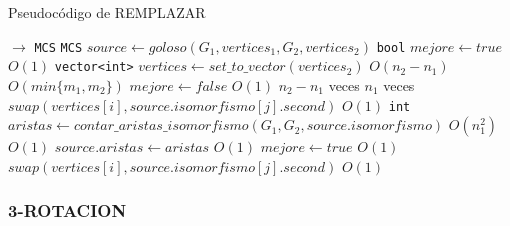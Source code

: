 \begin{algorithm}[H]
  \small
  \begin{algorithmic}[1]
  \caption{Pseudocódigo de REMPLAZAR}
  \label{algo:1-1}
    $\rightarrow$ \texttt{MCS}
      \State \texttt{MCS} $source \gets goloso(G_1, vertices_1, G_2, vertices_2)$
      \State \texttt{bool} $mejore \gets true$
      \Comment $O(1)$
      \State \texttt{vector<int>} $vertices \gets set\_to\_vector(vertices_2)$
      \Comment $O(n_2-n_1)$
      \Comment $O(min\{m_1, m_2\})$
        \State $mejore \gets false$
        \Comment $O(1)$
        \Comment $n_2-n_1$ veces
          \Comment $n_1$ veces
            \State $swap(vertices[i], source.isomorfismo[j].second)$
            \Comment $O(1)$
            \State \texttt{int} $aristas \gets contar\_aristas\_isomorfismo(G_1, G_2, source.isomorfismo)$
            \Comment $O(n_1^2)$
            \Comment $O(1)$
              \State $source.aristas \gets aristas$  
              \Comment $O(1)$            
              \State $mejore \gets true$
              \Comment $O(1)$
            \Else
              \State $swap(vertices[i], source.isomorfismo[j].second)$
              \Comment $O(1)$
            \EndIf
          \EndFor
        \EndFor
      \EndWhile
    \EndProcedure
  \end{algorithmic}
\end{algorithm}

\subsubsection{3-ROTACION}

